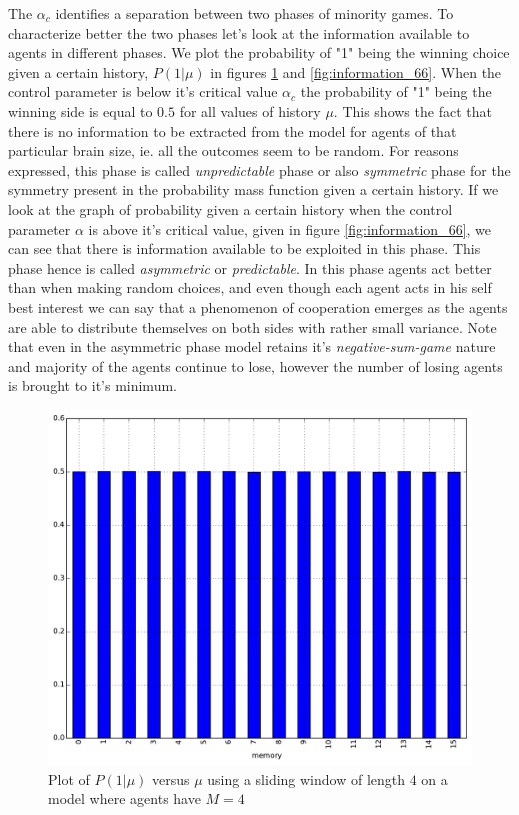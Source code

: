 The $\alpha_c$ identifies a separation between two phases of minority games.
To characterize better the two phases let's look at the information available to agents in different phases.
We plot the probability of "1" being the winning choice given a certain history, $P(1|\mu)$ in figures \ref{fig:information_44} and \ref{fig:information_66}.
When the control parameter is below it's critical value $\alpha_c$ the probability of "1" being the winning side is equal to $0.5$ for all values of history $\mu$.
This shows the fact that there is no information to be extracted from the model for agents of that particular brain size, ie. all the outcomes seem to be random.
For reasons expressed, this phase is called \textit{unpredictable} phase or also \textit{symmetric} phase for the symmetry present in the probability mass function given a certain history.
If we look at the graph of probability given a certain history when the control parameter $\alpha$ is above it's critical value, given in figure \ref{fig:information_66}, we can see that there is information available to be exploited in this phase.
This phase hence is called \textit{asymmetric} or \textit{predictable}.
In this phase agents act better than when making random choices, and even though each agent acts in his self best interest we can say that a phenomenon of cooperation emerges as the agents are able to distribute themselves on both sides with rather small variance.
Note that even in the asymmetric phase model retains it's \textit{negative-sum-game} nature and majority of the agents continue to lose, however the number of losing agents is brought to it's minimum.


\begin{figure}[h]
\begin{center}
\includegraphics[scale=0.4]{images/minority/information_probability_m4_a4.pdf}
\caption{Plot of $P(1|\mu)$ versus $\mu$ using a sliding window of length $4$ on a model where agents have $M=4$}
\label{fig:information_44}
\end{center}
\end{figure}

